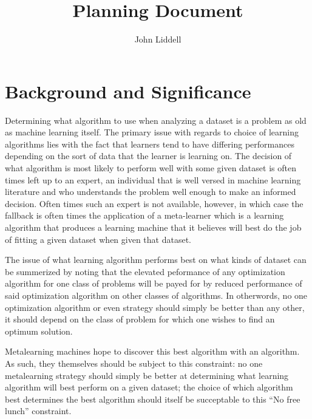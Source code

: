 \documentclass[a4paper,11pt]{article}
\date{}
\newcommand{\email}[1]{\texttt{\small #1}}
\begin{document}
	\title{Planning Document
	}

\author{John Liddell}
\affil{ \email{jl0000285@gmail.com}}



\maketitle

\section{Background and Significance}
  Determining what algorithm to use when analyzing a dataset is a problem as old
  as machine learning itself. The primary issue with regards to choice of learning
  algorithms lies with the fact that learners tend to have differing performances
  depending on the sort of data that the learner is learning on. The decision
  of what algorithm is most likely to perform well with some given dataset is often
  times left up to an expert,  an individual that is well versed in machine learning
  literature and who understands the problem well enough to make an informed decision.
  Often times such an expert is not available, however, in which case the fallback is
  often times the application of a meta-learner which is a learning algorithm that
  produces a learning machine that it believes will best do the job of fitting a given
  dataset when given that dataset.

  The issue of what learning algorithm performs best on what kinds of dataset can be
  summerized by noting that the elevated peformance of any optimization algorithm for one class of
  problems will be payed for by reduced performance of said optimization algorithm on other classes
  of algorithms. \cite{Wolpert} In otherwords, no one optimization algorithm or even strategy should
  simply be better than any other, it should depend on the class of problem for which one wishes to find
  an optimum solution.

  Metalearning machines hope to discover this best algorithm with an algorithm. As such, they themselves
  should be subject to this constraint: no one metalearning strategy should simply be better at determining
  what learning algorithm will best perform on a given dataset; the choice of which algorithm best
  determines the best algorithm should itself be succeptable to this ``No free lunch'' constraint.
\end{document}
